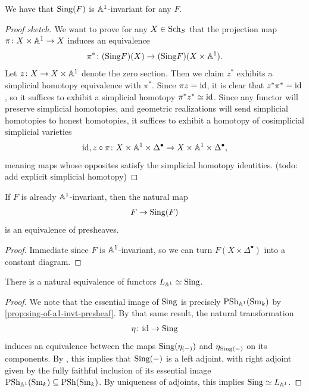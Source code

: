 \documentclass[11pt,openany]{book}
\renewcommand{\Pre}{\mathrm{PSh}}
\begin{document}
\begin{proposition} We have that $\mathrm{Sing}(F)$ is $\mathbb{A}^1$-invariant for any $F$.
\end{proposition}
\begin{proof}[Proof sketch]
We want to prove for any $X\in \mathrm{Sch}_S$ that the projection map $\pi \colon X \times \mathbb{A}^1 \to X$ induces an equivalence
\begin{align*}
    \pi^\ast \colon (\mathrm{Sing} F)(X) \to (\mathrm{Sing} F)(X \times \mathbb{A}^1).
\end{align*}
%
Let $z \colon X \to X \times \mathbb{A}^1$ denote the zero section. Then we claim $z^\ast$ exhibits a simplicial homotopy equivalence with $\pi^\ast$. Since $\pi z = \mathrm{id}$, it is clear that $z^\ast \pi^\ast = \mathrm{id}$, so it suffices to exhibit a simplicial homotopy $\pi^\ast z^\ast \simeq \mathrm{id}$. Since any functor will preserve simplicial homotopies, and geometric realizations will send simplicial homotopies to honest homotopies, it suffices to exhibit a homotopy of cosimplicial simplicial varieties
\begin{align*}
    \mathrm{id}, z\circ \pi \colon X \times \mathbb{A}^1 \times \Delta^\bullet \to X \times \mathbb{A}^1 \times \Delta^\bullet,
\end{align*}
meaning maps whose opposites satisfy the simplicial homotopy identities. (todo: add explicit simplicial homotopy)
\end{proof}

\begin{proposition}\label{prop:sing-of-a1-invt-presheaf} 
If $F$ is already $\mathbb{A}^1$-invariant, then the natural map
\begin{align*}
    F \to \mathrm{Sing}(F)
\end{align*}
is an equivalence of presheaves.
\end{proposition}
\begin{proof} Immediate since $F$ is $\mathbb{A}^1$-invariant, so we can turn $F(X \times \Delta^\bullet)$ into a constant diagram.
\end{proof}

\begin{proposition} There is a natural equivalence of functors $L_{\mathbb{A}^1} \simeq \mathrm{Sing}$.
\end{proposition}
\begin{proof}
We note that the essential image of $\mathrm{Sing}$ is precisely $\Pre_{\A^1}(\Sm_k)$ by \autoref{prop:sing-of-a1-invt-presheaf}. By that same result, the natural transformation
\begin{align*}
    \eta \colon \mathrm{id} \to \mathrm{Sing}
\end{align*}
induces an equivalence between the maps $\mathrm{Sing}(\eta_{(-)})$ and $\eta_{\mathrm{Sing}(-)}$ on its components. By \cite[5.2.7.4]{HTT}, this implies that $\mathrm{Sing}(-)$ is a left adjoint, with right adjoint given by the fully faithful inclusion of its essential image $\Pre_{\A^1}(\Sm_k) \subseteq \Pre(\Sm_k)$. By uniqueness of adjoints, this implies $\mathrm{Sing} \simeq L_{\mathbb{A}^1}$.
\end{proof}
\end{document}
